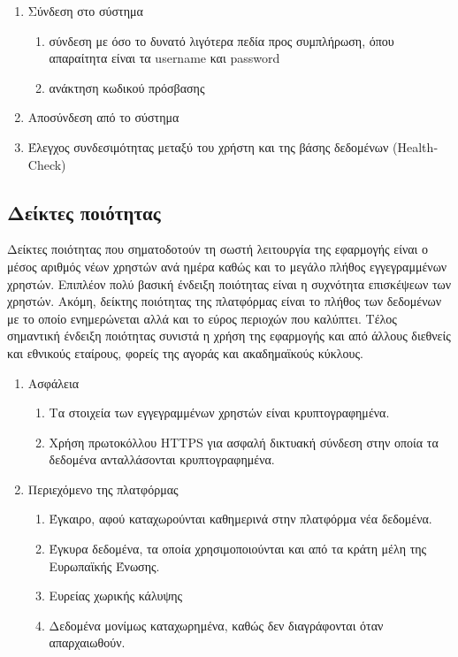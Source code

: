 \documentclass[a4paper,12pt, oneside]{article}
\begin{document}
\begin{enumerate}
   \item Σύνδεση στο σύστημα
    \begin{enumerate}
     \item σύνδεση με όσο το δυνατό λιγότερα πεδία προς συμπλήρωση, όπου \\ απαραίτητα είναι τα \textlatin{username} και  \textlatin{password}
     \item ανάκτηση κωδικού πρόσβασης
    \end{enumerate}
  \item Αποσύνδεση από το σύστημα
  \item Έλεγχος συνδεσιμότητας μεταξύ του χρήστη και της βάσης δεδομένων \textlatin{(HealthCheck)}
\end{enumerate}


\subsection{Δείκτες ποιότητας}
Δείκτες ποιότητας που σηματοδοτούν τη σωστή λειτουργία της εφαρμογής είναι ο μέσος αριθμός νέων χρηστών ανά ημέρα καθώς και το μεγάλο πλήθος εγγεγραμμένων χρηστών. Επιπλέον πολύ βασική ένδειξη ποιότητας είναι  η συχνότητα επισκέψεων των χρηστών. Ακόμη, δείκτης ποιότητας της πλατφόρμας είναι το πλήθος των δεδομένων με το οποίο ενημερώνεται αλλά και το εύρος περιοχών που καλύπτει. Τέλος σημαντική ένδειξη ποιότητας συνιστά η χρήση της εφαρμογής και από άλλους διεθνείς και εθνικούς εταίρους, φορείς της αγοράς και ακαδημαϊκούς κύκλους.
\renewcommand{\theenumi}{\arabic{enumi}}
\renewcommand{\theenumii}{\alph{enumii}}
\begin{enumerate}
   \item Ασφάλεια 
   \begin{enumerate}
     \item Τα στοιχεία των εγγεγραμμένων χρηστών είναι κρυπτογραφημένα.
     \item Χρήση πρωτοκόλλου \textlatin{HTTPS} για ασφαλή δικτυακή σύνδεση στην οποία τα δεδομένα ανταλλάσονται κρυπτογραφημένα.
   \end{enumerate}
   \item Περιεχόμενο της πλατφόρμας
   \begin{enumerate}
     \item Έγκαιρο, αφού καταχωρούνται καθημερινά στην πλατφόρμα νέα δεδομένα.
     \item Έγκυρα δεδομένα, τα οποία χρησιμοποιούνται και από τα κράτη μέλη της Ευρωπαϊκής Ένωσης.
     \item Ευρείας χωρικής κάλυψης
     \item Δεδομένα μονίμως καταχωρημένα, καθώς δεν διαγράφονται όταν απαρχαιωθούν.
   \end{enumerate}
\end{enumerate}
\end{document}
